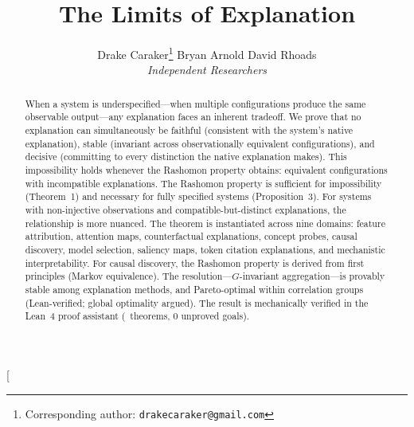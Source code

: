 \documentclass[twocolumn]{article}
\title{The Limits of Explanation}
\author{
  Drake Caraker\thanks{Corresponding author: \texttt{drakecaraker@gmail.com}} \quad
  Bryan Arnold \quad
  David Rhoads \\[4pt]
  \textit{Independent Researchers}
}
\date{}
\begin{document}
\twocolumn[
  \begin{@twocolumnfalse}
  \maketitle





\begin{abstract}
When a system is underspecified---when multiple configurations produce
the same observable output---any explanation faces an inherent
tradeoff. We prove that no explanation can simultaneously be faithful
(consistent with the system's native explanation), stable (invariant
across observationally equivalent configurations), and decisive
(committing to every distinction the native explanation makes). This
impossibility holds whenever the Rashomon property obtains: equivalent
configurations with incompatible explanations. The Rashomon property is sufficient for impossibility (Theorem~1) and necessary
for fully specified systems (Proposition~3). For systems with non-injective observations
and compatible-but-distinct explanations, the relationship is more nuanced. The theorem is instantiated across nine
domains: feature attribution, attention maps, counterfactual
explanations, concept probes, causal discovery, model selection,
saliency maps, token citation explanations, and mechanistic
interpretability. For causal discovery, the Rashomon property is derived
from first principles (Markov equivalence). The resolution---$G$-invariant
aggregation---is provably stable among explanation methods, and Pareto-optimal within
correlation groups (Lean-verified; global optimality argued). The result is mechanically
verified in the Lean~4 proof assistant (\ClaimMainTheorems~theorems, 0 unproved goals).
\end{abstract}


\end{@twocolumnfalse}
\end{document}
